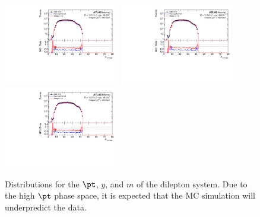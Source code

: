 \begin{figure}[h!]
  \centering
  \includegraphics[page=12,width=0.45\textwidth]{figures/ZjetOmnifoldMCDataComp.pdf}
  \includegraphics[page=20,width=0.45\textwidth]{figures/ZjetOmnifoldMCDataComp.pdf} \\
  \includegraphics[page=16,width=0.45\textwidth]{figures/ZjetOmnifoldMCDataComp.pdf}
  \caption{Distributions for the $\pt$, $y$, and $m$ of the dilepton system. Due to the high $\pt$ phase space, it is expected that the MC simulation will underpredict the data.}
  \label{fig:DilepVars}
\end{figure}

